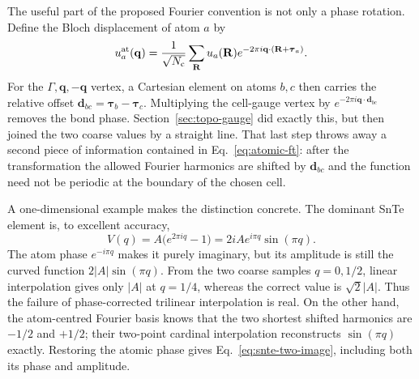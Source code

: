 \documentclass[11pt,a4paper]{article}
\newcommand{\qv}{\mathbf{q}}
\newcommand{\Rv}{\mathbf{R}}
\newcommand{\Nc}{N_{\mathrm{c}}}
\begin{document}
The useful part of the proposed Fourier convention is not only a phase
rotation.  Define the Bloch displacement of atom $a$ by
\begin{equation}
 u_a^{\rm at}(\qv)=\frac{1}{\sqrt{\Nc}}
 \sum_{\Rv}u_a(\Rv)
 e^{-2\pi i\qv\cdot(\Rv+\boldsymbol\tau_a)} .
 \label{eq:atomic-ft}
\end{equation}
For the $\Gamma,\qv,-\qv$ vertex, a Cartesian element on atoms $b,c$
then carries the relative offset
$\mathbf d_{bc}=\boldsymbol\tau_b-\boldsymbol\tau_c$.  Multiplying the
cell-gauge vertex by $e^{-2\pi i\qv\cdot\mathbf d_{bc}}$ removes the bond
phase.  Section~\ref{sec:topo-gauge} did exactly this, but then joined the
two coarse values by a straight line.  That last step throws away a second
piece of information contained in Eq.~\eqref{eq:atomic-ft}: after the
transformation the allowed Fourier harmonics are shifted by
$\mathbf d_{bc}$ and the function need not be periodic at the boundary of
the chosen cell.

A one-dimensional example makes the distinction concrete.  The dominant
SnTe element is, to excellent accuracy,
\begin{equation}
 V(q)=A\bigl(e^{2\pi i q}-1\bigr)
     =2iA e^{i\pi q}\sin(\pi q).
 \label{eq:snte-two-image}
\end{equation}
The atom phase $e^{-i\pi q}$ makes it purely imaginary, but its amplitude
is still the curved function $2|A|\sin(\pi q)$.  From the two coarse
samples $q=0,1/2$, linear interpolation gives only $|A|$ at $q=1/4$,
whereas the correct value is $\sqrt{2}|A|$.  Thus the failure of
phase-corrected trilinear interpolation is real.  On the other hand, the
atom-centred Fourier basis knows that the two shortest shifted harmonics
are $-1/2$ and $+1/2$; their two-point cardinal interpolation reconstructs
$\sin(\pi q)$ exactly.  Restoring the atomic phase gives
Eq.~\eqref{eq:snte-two-image}, including both its phase and amplitude.
\end{document}
